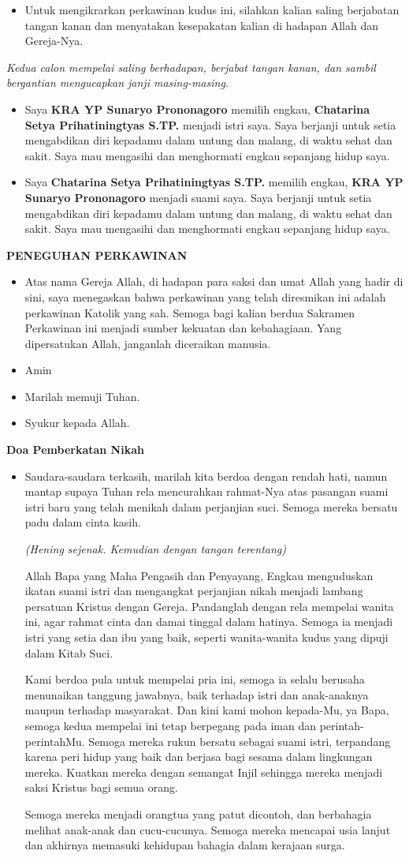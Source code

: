\documentclass[a5paper,titlepage,11pt,openany]{scrbook}
\makeatletter
\newcommand{\subjudul}[1]{%
  {\parindent \z@ 
    \interlinepenalty\@M \large \bfseries #1\par\nobreak \vskip 10\p@ }}
\newcommand{\BU}[1]{\begin{itemize} \item[U:] #1 \end{itemize}}
\newcommand{\BI}[1]{\begin{itemize} \item[I:] #1 \end{itemize}}
\newcommand{\BPL}[1]{\begin{itemize} \item[Naryo:] #1 \end{itemize}}
\newcommand{\BPW}[1]{\begin{itemize} \item[Katrin:] #1 \end{itemize}}
\newcommand{\camantri}{Chatarina Setya Prihatiningtyas S.TP. }
\newcommand{\camantra}{KRA YP Sunaryo Prononagoro }
\makeatother
\begin{document}
\BI{Untuk mengikrarkan perkawinan kudus ini, silahkan kalian saling berjabatan tangan kanan dan menyatakan kesepakatan kalian di hadapan Allah dan Gereja-Nya.}
           
\textit{Kedua calon mempelai saling berhadapan, berjabat tangan kanan, dan sambil bergantian mengucapkan janji masing-masing.}


\BPL{Saya \textbf{\camantra}  memilih engkau, \textbf{\camantri}  menjadi istri saya. Saya berjanji untuk setia mengabdikan diri kepadamu dalam untung dan malang, di waktu sehat dan sakit. Saya mau mengasihi dan menghormati engkau sepanjang hidup saya.}

\BPW{Saya \textbf{\camantri}  memilih engkau, \textbf{\camantra}  menjadi suami saya. Saya berjanji untuk setia mengabdikan diri kepadamu dalam untung dan malang, di waktu sehat dan sakit. Saya mau mengasihi dan menghormati engkau sepanjang hidup saya.}



\subjudul{PENEGUHAN PERKAWINAN}
\BI{Atas nama Gereja Allah, di hadapan para saksi dan umat Allah yang hadir di sini, saya menegaskan bahwa perkawinan yang telah diresmikan ini adalah perkawinan Katolik yang sah. Semoga bagi kalian berdua Sakramen Perkawinan ini menjadi sumber kekuatan dan kebahagiaan. Yang dipersatukan Allah, janganlah diceraikan manusia.}
\BU{Amin}
\BI{Marilah memuji Tuhan.}
\BU{Syukur kepada Allah.}

\subjudul{Doa Pemberkatan Nikah}

\BI{Saudara-saudara terkasih, marilah kita berdoa dengan rendah hati, namun mantap supaya Tuhan rela mencurahkan rahmat-Nya atas pasangan suami istri baru yang telah menikah dalam perjanjian suci. Semoga mereka bersatu padu dalam cinta kasih.

\textit{(Hening sejenak. Kemudian dengan tangan terentang)}

Allah Bapa yang Maha Pengasih dan Penyayang, Engkau menguduskan ikatan suami istri dan mengangkat perjanjian nikah menjadi lambang persatuan Kristus dengan Gereja. Pandanglah dengan rela mempelai wanita ini, agar rahmat cinta dan damai tinggal dalam hatinya. Semoga ia menjadi istri yang setia dan ibu yang baik, seperti wanita-wanita kudus yang dipuji dalam Kitab Suci.

Kami berdoa pula untuk mempelai pria ini, semoga ia selalu berusaha menunaikan tanggung jawabnya, baik terhadap istri dan anak-anaknya maupun terhadap masyarakat. Dan kini kami mohon kepada-Mu, ya Bapa, semoga kedua mempelai ini tetap berpegang pada iman dan perintah-perintahMu. Semoga mereka rukun bersatu sebagai suami istri, terpandang karena peri hidup yang baik dan berjasa bagi sesama dalam lingkungan mereka. Kuatkan mereka dengan semangat Injil sehingga mereka menjadi saksi Kristus bagi semua orang.

Semoga mereka menjadi orangtua yang patut dicontoh, dan berbahagia melihat anak-anak dan cucu-cucunya. Semoga mereka mencapai usia lanjut dan akhirnya memasuki kehidupan bahagia dalam kerajaan surga.}
\end{document}
